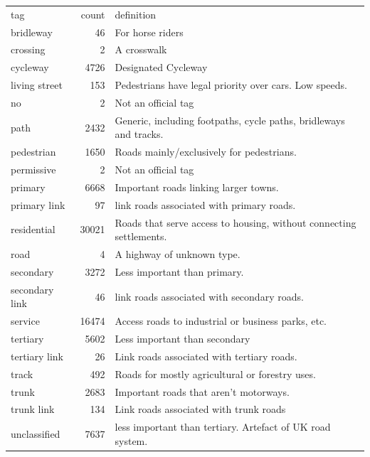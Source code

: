 \documentclass[11pt]{article} %
\begin{document}
\begin{table}
\begin{tabular}{lrl}
tag & count & definition \\
bridleway& 46 & For horse riders\\
crossing & 2 & A crosswalk \\
cycleway & 4726 & Designated Cycleway\\
living street & 153 & Pedestrians have legal priority over cars. Low speeds.\\
no & 2 & Not an official tag \\
path & 2432 & Generic, including footpaths, cycle paths, bridleways and tracks. \\
pedestrian & 1650 & Roads mainly/exclusively for pedestrians.\\
permissive & 2 & Not an official tag\\
primary & 6668 & Important roads linking larger towns.\\
primary link & 97 & link roads associated with primary roads.\\
residential & 30021 & Roads that serve access to housing, without connecting settlements.\\
 road & 4 & A highway of unknown type. \\
secondary & 3272 & Less important than primary.\\
secondary link & 46 & link roads associated with secondary roads.\\
service & 16474 & Access roads to industrial or business parks, etc. \\
tertiary & 5602 & Less important than secondary\\
tertiary link & 26 & Link roads associated with tertiary roads. \\ 
track & 492 & Roads for mostly agricultural or forestry uses. \\
trunk & 2683 & Important roads that aren't motorways. \\
trunk link & 134 & Link roads associated with trunk roads \\
unclassified & 7637 & less important than tertiary. Artefact of UK road system.\\ 
\end{tabular}
\end{table}
\end{document}
